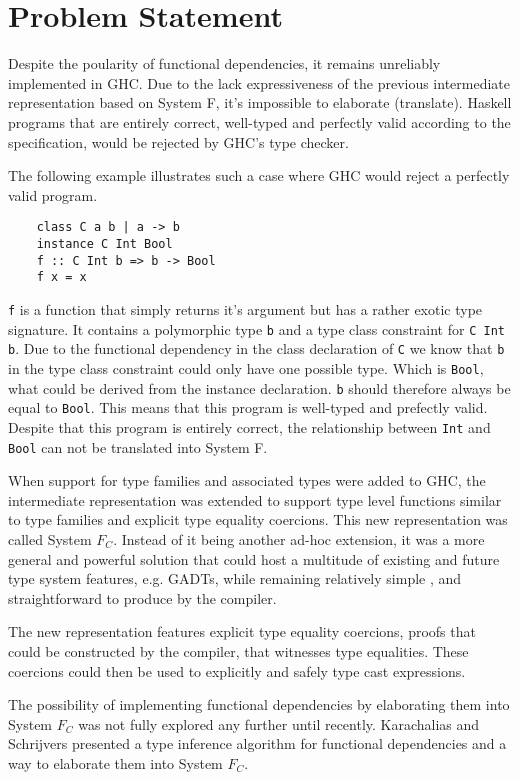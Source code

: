 \section{Problem Statement}
Despite the poularity of functional dependencies, it remains unreliably
implemented in GHC. Due to the lack expressiveness of the previous intermediate
representation based on System F, it's impossible to elaborate (translate).
Haskell programs that are entirely correct, well-typed and perfectly valid
according to the specification, would be rejected by GHC's type checker.

The following example illustrates such a case where GHC would reject a perfectly
valid program.
\begin{verbatim}
    class C a b | a -> b
    instance C Int Bool
    f :: C Int b => b -> Bool
    f x = x
\end{verbatim}

\texttt{f} is a function that simply returns it's argument but has a rather
exotic type signature. It contains a polymorphic type \texttt{b} and a type
class constraint for \texttt{C Int b}. Due to the functional dependency in the
class declaration of \texttt{C} we know that \texttt{b} in the type class
constraint could only have one possible type. Which is \texttt{Bool}, what could
be derived from the instance declaration. \texttt{b} should therefore always be
equal to \texttt{Bool}. This means that this program is well-typed and prefectly
valid. Despite that this program is entirely correct, the relationship between
\texttt{Int} and \texttt{Bool} can not be translated into System F.

When support for type families and associated types were added to GHC, the
intermediate representation was extended to support type level functions similar
to type families and explicit type equality coercions. This new representation
was called System $F_C$. Instead of it being another ad-hoc extension, it was a
more general and powerful solution that could host a multitude of existing and
future type system features, e.g. GADTs, while remaining relatively simple
, and straightforward to produce by the compiler.

The new representation features explicit type equality coercions, proofs that
could be constructed by the compiler, that witnesses type equalities. These
coercions could then be used to explicitly and safely type cast expressions.

The possibility of implementing functional dependencies by elaborating them into
System $F_C$ was not fully explored any further until recently. Karachalias and
Schrijvers\cite{Karachalias:2017:EFD:3156695.3122966} presented a type
inference algorithm for functional dependencies and a way to elaborate them into
System $F_C$.


